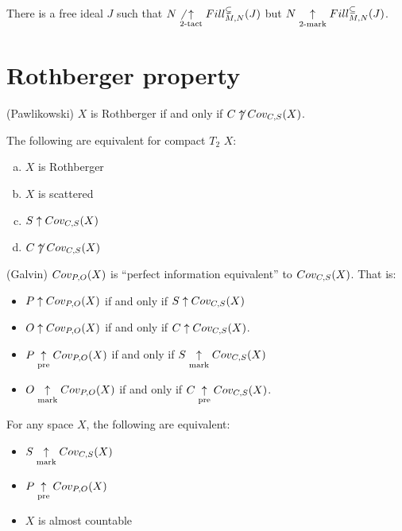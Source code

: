   \begin{ex}
    There is a free ideal $J$ such that $N\not\underset{2\text{-tact}}{\uparrow}Fill^{\subsetneq}_{M,N}(J)$ but $N\underset{2\text{-mark}}{\uparrow}Fill^{\subseteq}_{M,N}(J)$.
  \end{ex}








  \section{Rothberger property}

  \begin{thm}(Pawlikowski)
    $X$ is Rothberger if and only if $C\not\uparrow Cov_{C,S}(X)$.
  \end{thm}


  \begin{thm}
    The following are equivalent for compact $T_2$ $X$:
      \begin{enumerate}[(a)]
        \item $X$ is Rothberger
        \item $X$ is scattered
        \item $S\uparrow Cov_{C,S}(X)$
        \item $C\not\uparrow Cov_{C,S}(X)$
      \end{enumerate}
  \end{thm}

  \begin{thm}(Galvin)
  $Cov_{P,O}(X)$ is ``perfect information equivalent'' to $Cov_{C,S}(X)$. That is:

    \begin{itemize}
      \item $P\uparrow Cov_{P,O}(X)$ if and only if $S\uparrow Cov_{C,S}(X)$
      \item $O\uparrow Cov_{P,O}(X)$ if and only if $C\uparrow Cov_{C,S}(X)$.
    \end{itemize}
  \end{thm}

  \begin{thm}
    \begin{itemize}
      \item $P\underset{\text{pre}}{\uparrow}Cov_{P,O}(X)$ if and only if $S\underset{\text{mark}}{\uparrow}Cov_{C,S}(X)$
      \item $O\underset{\text{mark}}{\uparrow}Cov_{P,O}(X)$ if and only if $C\underset{\text{pre}}{\uparrow}Cov_{C,S}(X)$.
    \end{itemize}
  \end{thm}

  \begin{thm}
    For any space $X$, the following are equivalent:
    \begin{itemize}
      \item $S\underset{\text{mark}}{\uparrow}Cov_{C,S}(X)$
      \item $P\underset{\text{pre}}{\uparrow}Cov_{P,O}(X)$
      \item $X$ is almost countable
    \end{itemize}
  \end{thm}

